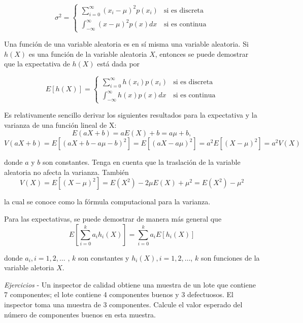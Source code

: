 \documentclass[11pt]{article}
\begin{document}
\begin{equation}
     \label{eq:aqui2}
     \sigma^{2}= \left\{
           \begin{array}{ll}
             \displaystyle \sum_{i=0}^{\infty}{(x_{i}-\mu)^2 p(x_{i})}    &  \text{si es discreta}\\
           \int_{-\infty}^{\infty}{(x-\mu)^2 p(x)dx}   & \text{si es continua} 
    \end{array}
         \right.
 \end{equation}

Una función de una variable aleatoria es en sí misma una variable
aleatoria. Si \(h (X)\) es una función de la variable aleatoria \(X\),
entonces se puede demostrar que la expectativa de \(h (X)\) está dada
por

\begin{equation}
     \label{eq:aqui3}
     E[h(X)]= \left\{
           \begin{array}{ll}
             \displaystyle \sum_{i=0}^{\infty}{h(x_{i}) p(x_{i})}    &  \text{si es discreta}\\
           \int_{-\infty}^{\infty}{ h(x)p(x)dx}   & \text{si es continua} 
           \end{array}
         \right.
 \end{equation}

Es relativamente sencillo derivar los siguientes resultados para la
expectativa y la varianza de una función lineal de X: \[
E(aX + b) = aE(X) + b = a\mu + b,
\] \[
V(aX + b) = E[(aX + b − a\mu − b)^2 ]
= E[(aX − a\mu)^2 ] = a^2 E[(X − \mu)^2 ] = a^2 V(X)
\]

donde \(a\) y \(b\) son constantes. Tenga en cuenta que la traslación de
la variable aleatoria no afecta la varianza. También \[
V(X) = E[(X − \mu)^2 ] = E(X^2 ) − 2\mu E(X) +\mu^2 = E(X^2 ) − \mu^2 
\]

la cual se conoce como la fórmula computacional para la varianza.

Para las expectativas, se puede demostrar de manera más general que \[
E\left[  \displaystyle \sum_{i=0}^{k}{a_{i}h_{i}(X)}
 \right]=  \displaystyle \sum_{i=0}^{k}{a_{i}E[h_{i}(X)]}
\]

donde \(a_{i}, i = 1, 2, \ldots\) , \(k\) son constantes y
\(h_{i} (X), i = 1, 2, \ldots\), \(k\) son funciones de la variable
aletoria \(X\).

\emph{Ejercicios} - Un inspector de calidad obtiene una muestra de un
lote que contiene 7 componentes; el lote contiene 4 componentes buenos y
3 defectuosos. El inspector toma una muestra de 3 componentes. Calcule
el valor esperado del número de componentes buenos en esta muestra.
\end{document}
